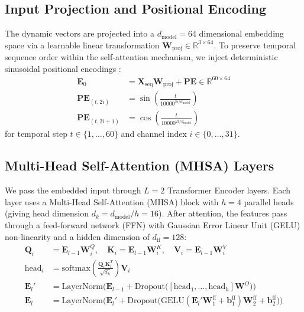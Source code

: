 \subsection{Input Projection and Positional Encoding}
The dynamic vectors are projected into a $d_{\text{model}} = 64$ dimensional embedding space via a learnable linear transformation $\mathbf{W}_{\text{proj}} \in \mathbb{R}^{3 \times 64}$. To preserve temporal sequence order within the self-attention mechanism, we inject deterministic sinusoidal positional encodings \cite{vaswani2017attention}:
\begin{align}
    \mathbf{E}_0 &= \mathbf{X}_{\text{seq}} \mathbf{W}_{\text{proj}} + \mathbf{PE} \in \mathbb{R}^{60 \times 64} \\
    \mathbf{PE}_{(t, 2i)} &= \sin\left(\frac{t}{10000^{2i/d_{\text{model}}}}\right) \\
    \mathbf{PE}_{(t, 2i+1)} &= \cos\left(\frac{t}{10000^{2i/d_{\text{model}}}}\right)
\end{align}
for temporal step $t \in \{1, \dots, 60\}$ and channel index $i \in \{0, \dots, 31\}$.

\subsection{Multi-Head Self-Attention (MHSA) Layers}
We pass the embedded input through $L = 2$ Transformer Encoder layers. Each layer uses a Multi-Head Self-Attention (MHSA) block with $h = 4$ parallel heads (giving head dimension $d_k = d_{\text{model}} / h = 16$). After attention, the features pass through a feed-forward network (FFN) with Gaussian Error Linear Unit (GELU) non-linearity and a hidden dimension of $d_{\text{ff}} = 128$:
\begin{align}
    \mathbf{Q}_i &= \mathbf{E}_{l-1} \mathbf{W}_i^Q, \quad \mathbf{K}_i = \mathbf{E}_{l-1} \mathbf{W}_i^K, \quad \mathbf{V}_i = \mathbf{E}_{l-1} \mathbf{W}_i^V \\
    \text{head}_i &= \text{softmax}\left(\frac{\mathbf{Q}_i \mathbf{K}_i^T}{\sqrt{d_k}}\right) \mathbf{V}_i \\
    \mathbf{E}_l' &= \text{LayerNorm}\Big(\mathbf{E}_{l-1} + \text{Dropout}\big([\text{head}_1, \dots, \text{head}_h]\mathbf{W}^O\big)\Big) \\
    \mathbf{E}_l &= \text{LayerNorm}\Big(\mathbf{E}_l' + \text{Dropout}\big(\text{GELU}(\mathbf{E}_l' \mathbf{W}_1^{\text{ff}} + \mathbf{b}_1^{\text{ff}})\mathbf{W}_2^{\text{ff}} + \mathbf{b}_2^{\text{ff}}\big)\Big)
\end{align}

